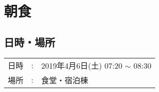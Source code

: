 
%

\section{朝食}

\subsection{日時・場所}

\begin{tabular}{p{}rp{}}
  日時 & : & 2019年4月6日(土) 07:20 $\sim$ 08:30\\
  場所 & : & 食堂・宿泊棟
\end{tabular}


